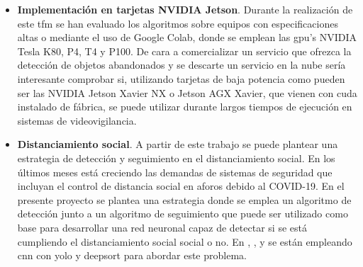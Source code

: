\begin{itemize}
    \item \textbf{Implementación en tarjetas NVIDIA Jetson}. Durante la realización de este \gls{tfm} se han evaluado los algoritmos sobre equipos con especificaciones altas o mediante el uso de Google Colab, donde se emplean las \gls{gpu}'s NVIDIA Tesla K80, P4, T4 y P100. De cara a comercializar un servicio que ofrezca la detección de objetos abandonados y se descarte un servicio en la nube sería interesante comprobar si, utilizando tarjetas de baja potencia como pueden ser las NVIDIA Jetson Xavier NX o Jetson AGX Xavier, que vienen con \gls{cuda} instalado de fábrica, se puede utilizar durante largos tiempos de ejecución en sistemas de videovigilancia.
    \item \textbf{Distanciamiento social}. A partir de este trabajo se puede plantear una estrategia de detección y seguimiento en el distanciamiento social. En los últimos meses está creciendo las demandas de sistemas de seguridad que incluyan el control de distancia social en aforos debido al COVID-19. En el presente proyecto se plantea una estrategia donde se emplea un algoritmo de detección junto a un algoritmo de seguimiento que puede ser utilizado como base para desarrollar una red neuronal capaz de detectar si se está cumpliendo el distanciamiento social social o no. En \cite{punn2020monitoring}, \cite{Rezaei_2020}, \cite{Gupta_2020} y \cite{fan2020autonomous} se están empleando \gls{cnn} con \gls{yolo} y \gls{deepsort} para abordar este problema.
    
\end{itemize}